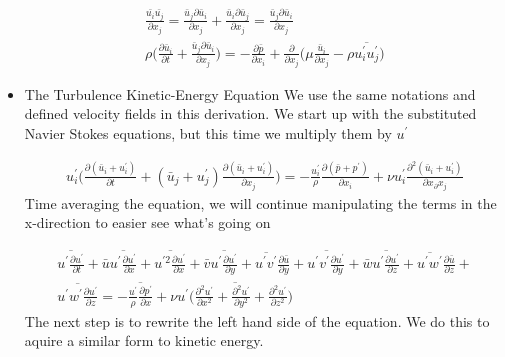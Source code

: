 \documentclass[a4paper,norsk]{article}
\begin{document}
\begin{itemize}
\begin{align*}
\frac{\bar{u_i}\bar{u_j}}{\partial x_j} = \frac{\bar{u}_j \partial \bar{u}_i}{\partial x_j} +
 \frac{\bar{u}_i \partial \bar{u}_j}{\partial x_j} = \frac{\bar{u}_j \partial \bar{u}_i}{\partial x_j} \\
\rho \big( \frac{\partial \bar{u}_i}{\partial t} +  \frac{\bar{u}_j \partial \bar{u}_i}{\partial x_j} \big) = 
- \frac{\partial \bar{p}}{\partial x_i} + \frac{\partial}{\partial x_j}
\big(\mu \frac{\bar{u}_i}{\partial x_j} - \rho \overline{u^\prime_i u^\prime_j}  \big)
\end{align*}
\newpage
\item{} The Turbulence Kinetic-Energy Equation \newline
We use the same notations and defined velocity fields in this derivation. We start up with the substituted
Navier Stokes equations, but this time we multiply them by $u^\prime$

\begin{align*}
u^\prime_i \big(\frac{\partial(\bar{u}_i + u^\prime_i)}{\partial t}
+ (\bar{u}_j + u^\prime_j) \frac{\partial (\bar{u}_i + u^\prime_i)}{\partial x_j} \big) =
- \frac{u^\prime_i}{\rho}\frac{\partial (\bar{p} + p^\prime)}{\partial x_i} + \nu u^\prime_i  
\frac{\partial^2(\bar{u}_i + u^\prime_i)} {\partial x_\partial x_j}
\end{align*}
Time averaging the equation, we will continue manipulating the terms in the x-direction to easier 
see what's going on

\begin{align*}
\overline{u^\prime \frac{\partial u^\prime}{\partial t}} + \bar{u}\overline{u^\prime \frac{\partial u^\prime}
{\partial x}} + \overline{u^{\prime 2}\frac{\partial u^\prime}{\partial x}} + \bar{v} 
\overline{u^\prime \frac{\partial u^\prime}{\partial y}} + \overline{u^\prime v^\prime}\frac{\partial \bar{u}}
{\partial y} + \overline{u^\prime v^\prime \frac{\partial u^\prime}{\partial y}} + \bar{w}\overline{u^\prime	
\frac{\partial u^\prime}{\partial z}} + \overline{u^\prime w^\prime} \frac{\partial \bar{u}}{\partial z} + \\
\overline{u^\prime w^\prime \frac{\partial u^\prime}{\partial z}} = - \overline{\frac{u^\prime}{\rho} 
\frac{\partial p^\prime}{\partial x}} + \nu \overline{u^\prime \big(\frac{\partial ^2 u^\prime}{\partial x^2} +
\frac{\partial ^2 u^\prime}{\partial y^2} + \frac{\partial ^2 u^\prime}{\partial z^2}\big)}
\end{align*}
The next step is to rewrite the left hand side of the equation. We do this to aquire a similar form to kinetic energy.


\end{itemize}
\end{document}
